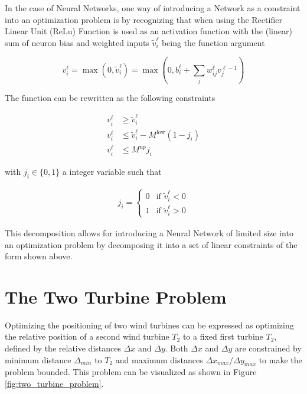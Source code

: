 In the case of Neural Networks, one way of introducing a Network as a constraint into an optimization problem is by recognizing that when using the Rectifier Linear Unit (ReLu) Function is used as an activation function with the (linear) sum of neuron bias and weighted inputs $\tilde{v}_i^\ell$ being the function argument


\begin{equation}
	v_i^\ell = \max(0, \tilde{v}_i^\ell) = \max(0,  b_i^\ell + \sum_j w_{ij}^\ell v_j^{\ell - 1})
\end{equation}


The function can be rewritten as the following constraints 

\begin{align}
	v_i^\ell &\geq \tilde{v}_i^\ell \\
	v_i^\ell &\leq \tilde{v}_i^\ell - M^{\text{low}}(1 - j_i) \\
	v_i^\ell &\leq M^{\text{up}} j_i
\end{align}

with $j_i \in \{0,1\}$ a integer variable such that

\begin{align}
	j_i =
	\begin{cases}
		0 & \text{if } \tilde{v}_i^\ell < 0 \\
		1 & \text{if } \tilde{v}_i^\ell > 0
	\end{cases}
\end{align}

This decomposition allows for introducing a Neural Network of limited size into an optimization problem by decomposing it into a set of linear constraints of the form shown above. \cite{ALCANTARA2023120895}

\section{The Two Turbine Problem}

Optimizing the positioning of two wind turbines can be expressed as optimizing the relative position of a second wind turbine $T_2$ to a fixed first turbine $T_2$, defined by the relative distances $\Delta x$ and  $\Delta y$. Both  $\Delta x$ and  $\Delta y$ are constrained by minimum distance $\Delta_{min}$ to  $T_2$ and maximum distances $\Delta x_{max}$/$\Delta y_{max}$ to make the problem bounded. 
This problem can be visualized as shown in Figure \ref{fig:two_turbine_problem}.

